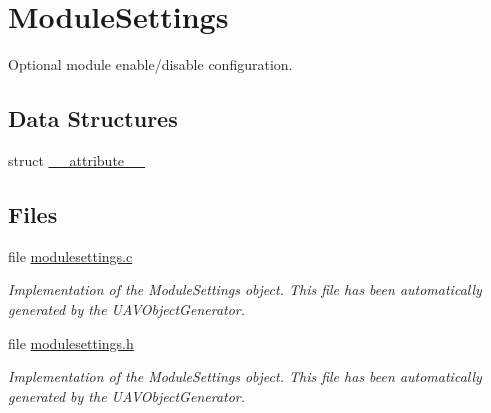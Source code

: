 \hypertarget{group___module_settings}{\section{\-Module\-Settings}
\label{group___module_settings}
}


\-Optional module enable/disable configuration.  


\subsection*{\-Data \-Structures}
\begin{DoxyCompactItemize}
\item 
struct \hyperlink{struct____attribute____}{\-\_\-\-\_\-attribute\-\_\-\-\_\-}
\end{DoxyCompactItemize}
\subsection*{\-Files}
\begin{DoxyCompactItemize}
\item 
file \hyperlink{modulesettings_8c}{modulesettings.\-c}
\begin{DoxyCompactList}\small\item\em \-Implementation of the \-Module\-Settings object. \-This file has been automatically generated by the \-U\-A\-V\-Object\-Generator. \end{DoxyCompactList}\item 
file \hyperlink{modulesettings_8h}{modulesettings.\-h}
\begin{DoxyCompactList}\small\item\em \-Implementation of the \-Module\-Settings object. \-This file has been automatically generated by the \-U\-A\-V\-Object\-Generator. \end{DoxyCompactList}\end{DoxyCompactItemize}
